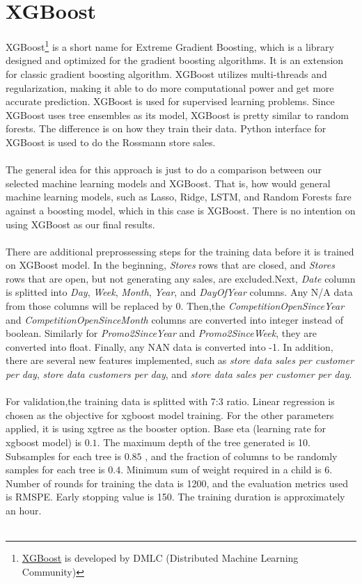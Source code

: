\section{XGBoost}
XGBoost\footnote{\href{https:https://github.com/dmlc/xgboost}{XGBoost} is developed by DMLC (Distributed Machine Learning Community)} is a short name for Extreme Gradient Boosting, which is a library designed and optimized for the gradient boosting algorithms. It is an extension for classic gradient boosting algorithm. XGBoost utilizes multi-threads and regularization, making it able to do more computational power and get more accurate prediction. XGBoost is used for supervised learning problems. Since XGBoost uses tree ensembles as its model, XGBoost is pretty similar to random forests. The difference is on how they train their data. Python interface for XGBoost is used to do the Rossmann store sales. \\ \\
The general idea for this approach is just to do a comparison between our selected machine learning models and XGBoost. That is, how would general machine learning models, such as Lasso, Ridge, LSTM, and Random Forests fare against a boosting model, which in this case is XGBoost. There is no intention on using XGBoost as our final results.\\ \\
There are additional preprossessing steps for the training data before it is trained on XGBoost model. In the beginning, \textit{Stores} rows that are closed, and \textit{Stores} rows that are open, but not generating any sales, are excluded.Next, \textit{Date} column is splitted into \textit{Day}, \textit{Week}, \textit{Month}, \textit{Year}, and \textit{DayOfYear} columns. Any N/A data from those columns will be replaced by 0. Then,the \textit{CompetitionOpenSinceYear} and \textit{CompetitionOpenSinceMonth} columns are converted into integer instead of boolean. Similarly for \textit{Promo2SinceYear} and \textit{Promo2SinceWeek}, they are converted into float. Finally, any NAN data is converted into -1. In addition, there are several new features implemented, such as \textit{store data sales per customer per day}, \textit{store data customers per day}, and \textit{store data sales per customer per day}. \\ \\
For validation,the training data is splitted with 7:3 ratio. Linear regression is chosen as the objective for xgboost model training. For the other parameters applied, it is using xgtree as the booster option. Base eta (learning rate for xgboost model) is $0.1$. The maximum depth of the tree generated is 10. Subsamples for each tree is $0.85$ , and the fraction of columns to be randomly samples for each tree is $0.4$. Minimum sum of weight required in a child is 6. Number of rounds for training the data is 1200, and the evaluation metrics used is RMSPE. Early stopping value is 150. The training duration is approximately an hour.\\ \\ 
